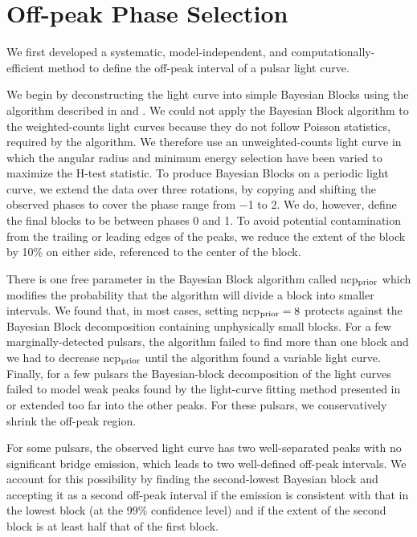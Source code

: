 \section{Off-peak Phase Selection}

We first developed a systematic, model-independent, and computationally-efficient method 
to define the off-peak interval of a pulsar light curve.

We begin by deconstructing the light curve 
into simple Bayesian Blocks using the algorithm described in
\citet{jackson_2005a_algorithm-optimal} and \citet{scargle_2013a_studies-astronomical}.  
We could not apply the Bayesian Block algorithm to the weighted-counts
light curves because they do not follow Poisson statistics, required
by the algorithm.
We therefore use an unweighted-counts light curve in which the angular radius and minimum energy selection have been varied to maximize the H-test statistic.  To produce Bayesian Blocks on a periodic light curve,
we extend the data over three rotations, by copying and shifting the
observed phases to cover the phase range from $-$1 to 2.  We do, however,
define the final blocks to be between phases 0 and 1.  
To avoid potential contamination from the trailing or leading edges of
the peaks, we reduce the extent of the block by 10\% on either side,
referenced to the center of the block.

There is one free parameter in the Bayesian Block algorithm called
ncp$\rm _{prior}$ which modifies the probability that the
algorithm will divide a block into smaller intervals.
We found that, in most cases, setting ncp$\rm _{prior}=8$ protects against
the Bayesian Block decomposition containing unphysically small blocks.
For a few marginally-detected pulsars, the algorithm failed 
to find more than one block and we had to decrease ncp$\rm _{prior}$ until the
algorithm found a variable light curve. Finally, for a few pulsars the 
Bayesian-block decomposition of the light curves failed to model 
weak peaks found by the light-curve fitting method
presented in \citep{abdo_2013a_second-fermi} or extended
too far into the other peaks. For these pulsars,
we conservatively shrink the off-peak region.

For some pulsars, the observed light curve has two well-separated peaks
with no significant bridge emission, which leads to two well-defined
off-peak intervals.  We account for this possibility by finding the second-lowest 
Bayesian block and accepting it as a second off-peak interval if
the emission is consistent with that in the lowest block (at the 99\%
confidence level) and if the extent of the second block is at least half
that of the first block.

